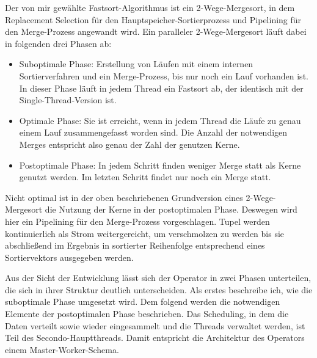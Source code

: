 \documentclass[a4paper,12pt,twoside]{article}
\begin{document}
Der von mir gewählte Fastsort-Algorithmus ist ein 2-Wege-Mergesort, in dem Replacement Selection für den Hauptspeicher-Sortierprozess und Pipelining für den Merge-Prozess angewandt wird. Ein paralleler 2-Wege-Mergesort läuft dabei in folgenden drei Phasen ab:

\begin{itemize}
	\item Suboptimale Phase: Erstellung von Läufen mit einem internen Sortierverfahren und ein Merge-Prozess, bis nur noch ein Lauf vorhanden ist. In dieser Phase läuft in jedem Thread ein Fastsort ab, der identisch mit der Single-Thread-Version ist.
	\item Optimale Phase: Sie ist erreicht, wenn in jedem Thread die Läufe zu genau einem Lauf zusammengefasst worden sind. Die Anzahl der notwendigen Merges entspricht also genau der Zahl der genutzen Kerne. 
	\item Postoptimale Phase: In jedem Schritt finden weniger Merge statt als Kerne genutzt werden. Im letzten Schritt findet nur noch ein Merge statt.
\end{itemize}

Nicht optimal ist in der oben beschriebenen Grundversion eines 2-Wege-Mergesort die Nutzung der Kerne in der postoptimalen Phase. Deswegen wird hier ein Pipelining für den Merge-Prozess vorgeschlagen. Tupel werden kontinuierlich als Strom weitergereicht, um verschmolzen zu werden bis sie abschließend im Ergebnis in sortierter Reihenfolge entsprechend eines Sortiervektors ausgegeben werden. 

Aus der Sicht der Entwicklung lässt sich der Operator in zwei Phasen unterteilen, die sich in ihrer Struktur deutlich unterscheiden. Als erstes beschreibe ich, wie die suboptimale Phase umgesetzt wird. Dem folgend werden die notwendigen Elemente der postoptimalen Phase beschrieben. Das Scheduling, in dem die Daten verteilt sowie wieder eingesammelt und die Threads verwaltet werden, ist Teil des Secondo-Hauptthreads. Damit entspricht die Architektur des Operators einem Master-Worker-Schema.
\end{document}
